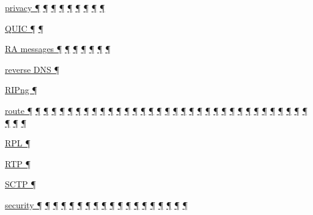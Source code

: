 \documentclass[
]{article}
\begin{document}
\hyperref[addresses]{privacy ¶} \hyperref[auto-configuration]{¶}
\hyperref[source-and-destination-address-selection]{¶}
\hyperref[ipv6-primary-differences-from-ipv4]{¶} \hyperref[security]{¶}
\hyperref[layer-2-considerations]{¶}
\hyperref[basic-windows-commands]{¶}
\hyperref[multi-prefix-operation]{¶} \hyperref[security-operation]{¶}

\hyperref[transport-protocols]{QUIC ¶} \hyperref[multihoming]{¶}

\hyperref[address-resolution]{RA messages ¶}
\hyperref[auto-configuration]{¶} \hyperref[managed-configuration]{¶}
\hyperref[routing]{¶} \hyperref[prefix-per-host]{¶}
\hyperref[multi-prefix-operation]{¶}
\hyperref[advanced-troubleshooting]{¶}

\hyperref[dns]{reverse DNS ¶}

\hyperref[routing]{RIPng ¶}

\hyperref[why-version-6]{route ¶} \hyperref[ipv6-basic-technology]{¶}
\hyperref[address-resolution]{¶} \hyperref[addresses]{¶}
\hyperref[auto-configuration]{¶} \hyperref[dns]{¶}
\hyperref[extension-headers-and-options]{¶}
\hyperref[layer-2-functions]{¶} \hyperref[managed-configuration]{¶}
\hyperref[packet-format]{¶} \hyperref[routing]{¶}
\hyperref[traffic-class-and-flow-label]{¶}
\hyperref[coexistence-with-legacy-ipv4]{¶}
\hyperref[dual-stack-scenarios]{¶}
\hyperref[ipv6-primary-differences-from-ipv4]{¶}
\hyperref[translation-and-ipv4-as-a-service]{¶} \hyperref[tunnels]{¶}
\hyperref[filtering]{¶} \hyperref[layer-2-considerations]{¶}
\hyperref[topology-obfuscation]{¶} \hyperref[network-design]{¶}
\hyperref[address-planning]{¶} \hyperref[management-and-operations]{¶}
\hyperref[address-and-prefix-management]{¶}
\hyperref[energy-consumption]{¶} \hyperref[multi-prefix-operation]{¶}
\hyperref[multihoming]{¶} \hyperref[packet-size-and-jumbo-frames]{¶}
\hyperref[routing-operation]{¶} \hyperref[security-operation]{¶}
\hyperref[deployment-by-carriers]{¶}
\hyperref[deployment-in-the-enterprise]{¶}
\hyperref[deployment-in-the-home]{¶} \hyperref[troubleshooting]{¶}
\hyperref[advanced-troubleshooting]{¶} \hyperref[tools]{¶}
\hyperref[obsolete-features-in-ipv6]{¶} \hyperref[further-reading]{¶}

\hyperref[routing]{RPL ¶}

\hyperref[transport-protocols]{RTP ¶}

\hyperref[transport-protocols]{SCTP ¶}

\hyperref[dns]{security ¶} \hyperref[extension-headers-and-options]{¶}
\hyperref[managed-configuration]{¶} \hyperref[packet-format]{¶}
\hyperref[source-and-destination-address-selection]{¶}
\hyperref[dual-stack-scenarios]{¶}
\hyperref[ipv6-primary-differences-from-ipv4]{¶}
\hyperref[obsolete-techniques]{¶}
\hyperref[translation-and-ipv4-as-a-service]{¶} \hyperref[security]{¶}
\hyperref[filtering]{¶} \hyperref[layer-2-considerations]{¶}
\hyperref[topology-obfuscation]{¶}
\hyperref[address-and-prefix-management]{¶}
\hyperref[multi-prefix-operation]{¶} \hyperref[security-operation]{¶}
\hyperref[deployment-in-the-enterprise]{¶}
\hyperref[obsolete-features-in-ipv6]{¶} \hyperref[further-reading]{¶}
\end{document}
